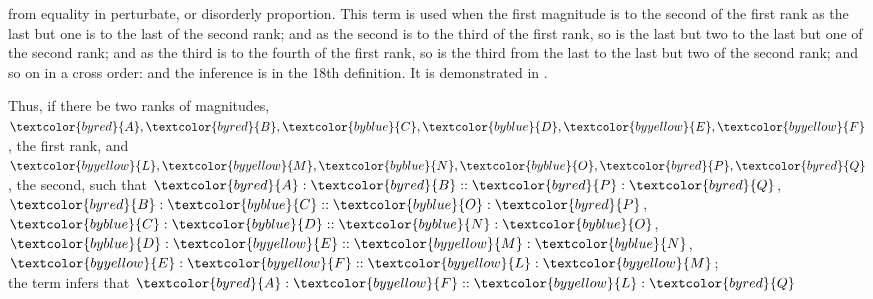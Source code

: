 \label{def:V.XX} 
\def\varA{\textcolor{byred}{A}}
\def\varB{\textcolor{byred}{B}}
\def\varC{\textcolor{byblue}{C}}
\def\varD{\textcolor{byblue}{D}}
\def\varE{\textcolor{byyellow}{E}}
\def\varF{\textcolor{byyellow}{F}}
\def\varL{\textcolor{byyellow}{L}}
\def\varM{\textcolor{byyellow}{M}}
\def\varN{\textcolor{byblue}{N}}
\def\varO{\textcolor{byblue}{O}}
\def\varP{\textcolor{byred}{P}}
\def\varQ{\textcolor{byred}{Q}}
 from equality in perturbate, or disorderly proportion. This term is used when the first magnitude is to the second of the first rank as the last but one is to the last of the second rank; and as the second is to the third of the first rank, so is the last but two to the last but one of the second rank; and as the third is to the fourth of the first rank, so is the third from the last to the last but two of the second rank; and so on in a cross order: and the inference is in the 18th definition. It is demonstrated in .

\begin{center}
Thus, if there be two ranks of magnitudes,\\
$\varA, \varB, \varC, \varD, \varE, \varF$, the first rank,
and $\varL, \varM, \varN, \varO, \varP, \varQ$, the second,
such that $\varA : \varB :: \varP : \varQ$, $\varB : \varC :: \varO : \varP$, $\varC : \varD :: \varN : \varO$, $\varD : \varE :: \varM : \varN$, $\varE : \varF :: \varL : \varM$;\\
the term  infers that $\varA : \varF :: \varL : \varQ$
\end{center}

\vfill\pagebreak

\label{prop:V.XX}

